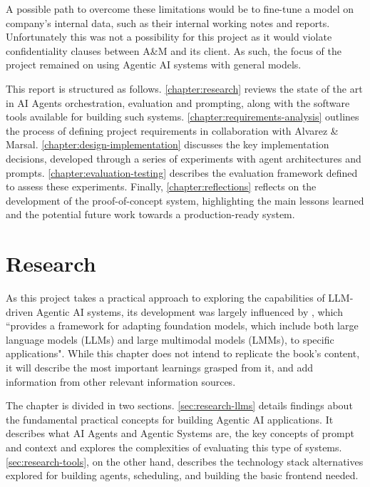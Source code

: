 \documentclass[a4paper]{report}
\begin{document}
A possible path to overcome these limitations would be to fine-tune a model on  company's internal data, such as their internal working notes and reports. Unfortunately this was not a possibility for this project as it would violate confidentiality clauses between A\&M and its client. As such, the focus of the project remained on using Agentic AI systems with general models.

This report is structured as follows. \autoref{chapter:research} reviews the state of the art in AI Agents orchestration, evaluation and prompting, along with the software tools available for building such systems. \autoref{chapter:requirements-analysis} outlines the process of defining project requirements in collaboration with Alvarez \& Marsal. \autoref{chapter:design-implementation} discusses the key implementation decisions, developed through a series of experiments with agent architectures and prompts. \autoref{chapter:evaluation-testing} describes the evaluation framework defined to assess these experiments. Finally, \autoref{chapter:reflections} reflects on the development of the proof-of-concept system, highlighting the main lessons learned and the potential future work towards a production-ready system.

\chapter{Research}
\label{chapter:research}

As this project takes a practical approach to exploring the capabilities of LLM-driven Agentic AI systems, its development was largely influenced by \cite{aiebook2025}, which ``provides a framework for adapting foundation models, which include both large language models (LLMs) and large multimodal models (LMMs), to specific applications". While this chapter does not intend to replicate the book's content, it will describe the most important learnings grasped from it, and add information from other relevant information sources.

The chapter is divided in two sections. \autoref{sec:research-llms} details findings about the fundamental practical concepts for building Agentic AI applications. It describes what AI Agents and Agentic Systems are, the key concepts of prompt and context and explores the complexities of evaluating this type of systems. \autoref{sec:research-tools}, on the other hand, describes the technology stack alternatives explored for building agents, scheduling, and building the basic frontend needed.
\end{document}
